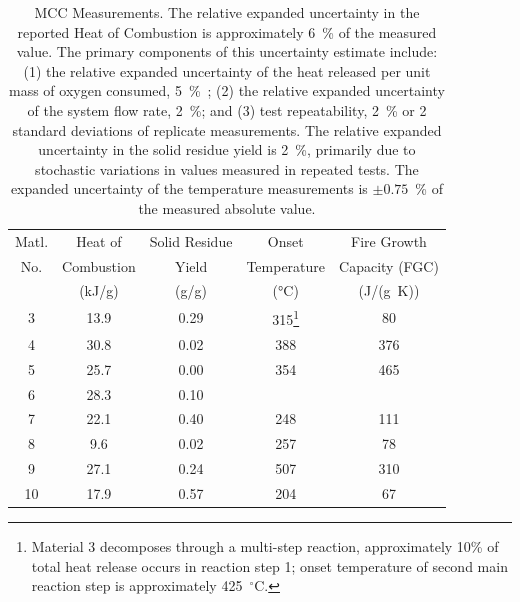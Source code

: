\begin{table}
\caption[Summary of MCC Measurements]{MCC Measurements. The relative expanded uncertainty in the reported Heat of Combustion is approximately 6~\% of the measured value. The primary components of this uncertainty estimate include: (1) the relative expanded uncertainty of the heat released per unit mass of oxygen consumed, 5~\%~\cite{Huggett:1}; (2) the relative expanded uncertainty of the system flow rate, 2~\%; and (3) test repeatability, 2~\% or 2 standard deviations of replicate measurements. The relative expanded uncertainty in the solid residue yield is 2~\%, primarily due to stochastic variations in values measured in repeated tests. The expanded uncertainty of the temperature measurements is $\pm 0.75$~\% of the measured absolute value. }
\label{MCC}
\begin{minipage}{\textwidth}
\begin{tabular}{ccccc}
\hline
Matl.  & Heat of        & Solid Residue    & Onset              & Fire Growth             \\
No.    & Combustion     & Yield            & Temperature        & Capacity (FGC)          \\
       & (kJ/g)         & (g/g)            & (°C)               & (J/(g~K))               \\ \hline
3      &  13.9          & 0.29             & 315\footnote{Material 3 decomposes through a multi-step reaction, approximately 10\% of total heat release occurs in reaction step 1; onset temperature of second main reaction step is approximately 425~$^\circ$C.}     & 80             \\
4      &  30.8          & 0.02             & 388                & 376                     \\
5      &  25.7          & 0.00             & 354                & 465         \\
6      &  28.3          & 0.10             &                    &              \\
7      &  22.1          & 0.40             & 248                & 111            \\
8      &   9.6          & 0.02             & 257                &  78           \\
9      &  27.1          & 0.24             & 507                & 310             \\
10     &  17.9          & 0.57             & 204                &  67            \\
\hline
\end{tabular}
\end{minipage}
\end{table}



